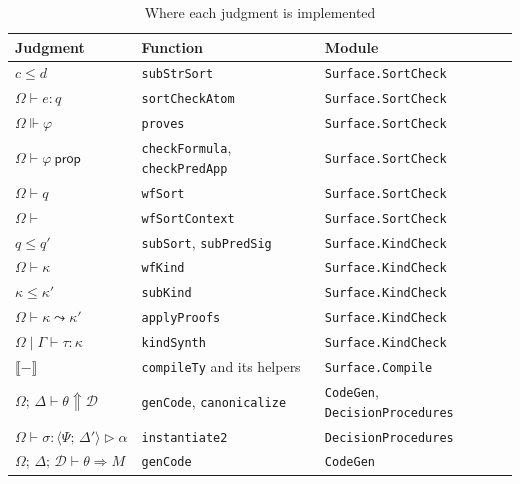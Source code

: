 \documentclass[11pt]{article}
\newcommand{\kw}[1]{\mathsf{#1}}
\newcommand{\proves}{\Vdash}
\newcommand{\isprop}{\ \kw{prop}}
\newcommand{\discharge}[3]{#1 \vdash #2 \leadsto #3}
\newcommand{\kinding}[4]{#1 \mid #2 \vdash #3 : #4}
\newcommand{\sem}[1]{\llbracket #1 \rrbracket}
\newcommand{\dproc}[2]{\langle #1;\, #2 \rangle}
\newcommand{\supplies}[4]{#1;\, #2 \vdash #3 \Uparrow #4}
\newcommand{\matches}[4]{#1 \vdash #2 : #3 \rhd #4}
\newcommand{\compiles}[5]{#1;\, #2;\, #3 \vdash #4 \Rightarrow #5}
\newcommand{\code}[1]{\texttt{#1}}
\theoremstyle{remark}
\begin{document}
\begin{table}[!htbp]
\centering
\begin{tabular}{lll}
\toprule
Judgment & Function & Module \\
\midrule
$c \leq d$ & \code{subStrSort} & \code{Surface.SortCheck} \\
$\Omega \vdash e : q$ & \code{sortCheckAtom} & \code{Surface.SortCheck} \\
$\Omega \proves \varphi$ & \code{proves} & \code{Surface.SortCheck} \\
$\Omega \vdash \varphi \isprop$ & \code{checkFormula}, \code{checkPredApp} & \code{Surface.SortCheck} \\
$\Omega \vdash q$ & \code{wfSort} & \code{Surface.SortCheck} \\
$\Omega \vdash$ & \code{wfSortContext} & \code{Surface.SortCheck} \\
$q \leq q'$ & \code{subSort}, \code{subPredSig} & \code{Surface.KindCheck} \\
$\Omega \vdash \kappa$ & \code{wfKind} & \code{Surface.KindCheck} \\
$\kappa \leq \kappa'$ & \code{subKind} & \code{Surface.KindCheck} \\
$\discharge{\Omega}{\kappa}{\kappa'}$ & \code{applyProofs} & \code{Surface.KindCheck} \\
$\kinding{\Omega}{\Gamma}{\tau}{\kappa}$ & \code{kindSynth} & \code{Surface.KindCheck} \\
$\sem{-}$ & \code{compileTy} and its helpers & \code{Surface.Compile} \\
$\supplies{\Omega}{\Delta}{\theta}{\mathcal{D}}$ & \code{genCode}, \code{canonicalize} & \code{CodeGen}, \code{DecisionProcedures} \\
$\matches{\Omega}{\sigma}{\dproc{\Psi}{\Delta'}}{\alpha}$ & \code{instantiate2} & \code{DecisionProcedures} \\
$\compiles{\Omega}{\Delta}{\mathcal{D}}{\theta}{M}$ & \code{genCode} & \code{CodeGen} \\
\bottomrule
\end{tabular}
\caption{Where each judgment is implemented}
\label{tab:implementation}
\end{table}
\end{document}
